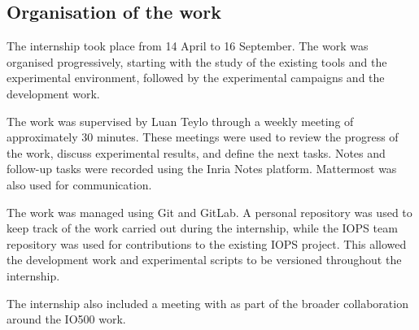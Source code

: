 \subsection{Organisation of the work}

The internship took place from 14 April to 16 September. The work was
organised progressively, starting with the study of the existing tools and
the experimental environment, followed by the experimental campaigns and
the development work.

The work was supervised by Luan Teylo through a weekly meeting of
approximately 30 minutes. These meetings were used to review the progress
of the work, discuss experimental results, and define the next tasks.
Notes and follow-up tasks were recorded using the Inria Notes platform.
Mattermost was also used for communication.

The work was managed using Git and GitLab. A personal repository was used
to keep track of the work carried out during the internship, while the
IOPS team repository was used for contributions to the existing IOPS
project. This allowed the development work and experimental scripts to be
versioned throughout the internship.

The internship also included a meeting with  as part of the broader collaboration around the
IO500 work.

